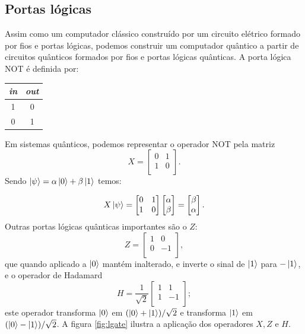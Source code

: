 \subsection{Portas lógicas}
\label{subsec:pl}

Assim como um computador clássico construído por um circuito elétrico formado por fios e portas lógicas, podemos construir um computador quântico a partir de circuitos quânticos formados por fios e portas lógicas quânticas.
A porta lógica \textsf{NOT} é definida por:

{\centering
\begin{tabular}{c|c}
\hline
\textit{in} & \textit{out} \\
\hline
1 & 0 \\
0 & 1 \\
\hline
\end{tabular}
\par}

\noindent
Em sistemas quânticos, podemos representar o operador \textsf{NOT} pela matriz
%
\begin{equation}
    X = \begin{bmatrix}
        0 & 1 \\
        1 & 0 \\
    \end{bmatrix}.
\end{equation}
Sendo $\ket{\psi} = \alpha \ket{0} + \beta\ket{1}$ temos:

\begin{equation}
    X\ket{\psi} = \begin{bmatrix}
        0 & 1 \\
        1 & 0
    \end{bmatrix} \begin{bmatrix}
        \alpha \\
        \beta
    \end{bmatrix} = \begin{bmatrix}
        \beta \\
        \alpha
    \end{bmatrix}.
\end{equation}
\noindent
Outras portas lógicas quânticas importantes são o $Z$:
%
\begin{equation}
    Z = \begin{bmatrix}
        1 &  0 \\
        0 & -1 \\
    \end{bmatrix},
\end{equation}
que quando aplicado a $\ket{0}$ mantém inalterado, e inverte o sinal de $\ket{1}$ para $-\ket{1}$, e o operador de Hadamard
%
\begin{equation}
    H = \frac{1}{\sqrt{2}}\begin{bmatrix}
        1 &  1 \\
        1 & -1 \\
    \end{bmatrix};
\end{equation}
%
este operador transforma $\ket{0}$ em $(\ket{0}+ \ket{1})/\sqrt{2}$ e transforma $\ket{1}$ em $(\ket{0}-\ket{1})/\sqrt{2}$. A figura \ref{fig:lgate} ilustra a aplicação dos operadores $X, Z$ e $H$.

